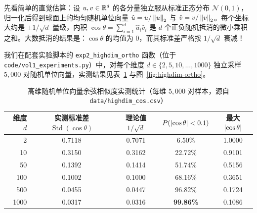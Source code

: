 先看简单的直觉估算：设 $u, v \in \mathbb{R}^d$ 的各分量独立服从标准正态分布 $\mathcal{N}(0, 1)$，归一化后得到球面上的均匀随机单位向量 $\hat{u} = u/\left\|u\right\|_2$ 与 $\hat{v} = v/\left\|v\right\|_2$。每个坐标大约是 $\pm 1/\sqrt{d}$ 量级，内积 $\cos\theta = \sum_{i=1}^d \hat{u}_i \hat{v}_i$ 是 $d$ 个正负随机抵消的微小乘积之和。大数抵消的结果是：$\cos\theta$ 的均值为 $0$，而其标准差严格按 $1/\sqrt{d}$ 衰减！

我们在配套实验脚本的 \texttt{exp2\_highdim\_ortho} 函数（位于 \texttt{code/vol1\_experiments.py}）中，对每个维度 $d \in \{2, 5, 10, \dots, 1000\}$ 独立采样 $5{,}000$ 对随机单位向量，实测结果见表~\ref{tab:highdim-cos} 与图~\ref{fig:highdim-ortho}。

\begin{table}[htbp]
\centering
\caption{高维随机单位向量余弦相似度实测统计（每维 $5{,}000$ 对样本，源自 \texttt{data/highdim\_cos.csv}）}\label{tab:highdim-cos}
{\small
\begin{tabular}{@{}rcccc@{}}
\toprule
\textbf{维度 $d$} & \textbf{实测标准差 $\operatorname{Std}(\cos\theta)$} & \textbf{理论值 $1/\sqrt{d}$} & \textbf{$P(\left|\cos\theta\right| < 0.1)$} & \textbf{最大 $\left|\cos\theta\right|$} \\
\midrule
2 & 0.7118 & 0.7071 & 6.50\% & 1.0000 \\
10 & 0.3150 & 0.3162 & 22.72\% & 0.9101 \\
50 & 0.1392 & 0.1414 & 51.74\% & 0.5156 \\
100 & 0.1002 & 0.1000 & 68.16\% & 0.3651 \\
500 & 0.0455 & 0.0447 & 96.82\% & 0.1724 \\
1000 & 0.0317 & 0.0316 & \textbf{99.86\%} & 0.1086 \\
\bottomrule
\end{tabular}}
\end{table}

